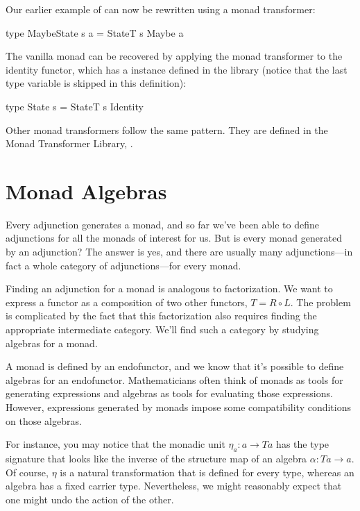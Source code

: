 \documentclass[DaoFP]{subfiles}
\begin{document}
Our earlier example of  can now be rewritten using a monad transformer:
\begin{haskell}
type MaybeState s a = StateT s Maybe a
\end{haskell}

The vanilla  monad can be recovered by applying the  monad transformer to the identity functor, which has a  instance defined in the library (notice that the last type variable  is skipped in this definition):
\begin{haskell}
type State s = StateT s Identity
\end{haskell}

Other monad transformers follow the same pattern. They are defined in the Monad Transformer Library, .

\section{Monad Algebras}

Every adjunction generates a monad, and so far we've been able to define adjunctions for all the monads of interest for us. But is every monad generated by an adjunction? The answer is yes, and there are usually many adjunctions---in fact a whole category of adjunctions---for every monad.

Finding an adjunction for a monad is analogous to factorization. We want to express a functor as a composition of two other functors, $T = R \circ L$. The problem is complicated by the fact that this factorization also requires finding the appropriate intermediate category. We'll find such a category by studying algebras for a monad.

A monad is defined by an endofunctor, and we know that it's possible to define algebras for an endofunctor. Mathematicians often think of monads as tools for generating expressions and algebras as tools for evaluating those expressions. However, expressions generated by monads impose some compatibility conditions on those algebras. 

For instance, you may notice that the monadic unit $\eta_a \colon a \to T a$ has the type signature that looks like the inverse of the structure map of an algebra $\alpha \colon T a \to a$. Of course, $\eta$ is a natural transformation that is defined for every type, whereas an algebra has a fixed carrier type. Nevertheless, we might reasonably expect that one might undo the action of the other.
\end{document}
